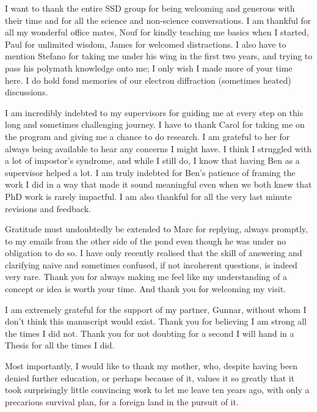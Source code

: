 \documentclass[
11pt, %
oneside, %
english, %
onehalfspacing, %
nolistspacing, %
liststotoc, %
headsepline, %
chapterinoneline, %
]{MastersDoctoralThesis} %
\begin{document}

\begin{acknowledgements}

\vspace{2cm}
I want to thank the entire SSD group for being welcoming and generous with their time and for all the science and non-science conversations. I am thankful for all my wonderful office mates, Nouf for kindly teaching me basics when I started, Paul for unlimited wisdom, James for welcomed distractions. I also have to mention Stefano for taking me under his wing in the first two years, and trying to pass his polymath knowledge onto me; I only wish I made more of your time here. I do hold fond memories of our electron diffraction (sometimes heated) discussions.

I am incredibly indebted to my supervisors for guiding me at every step on this long and sometimes challenging journey. I have to thank Carol for taking me on the program and giving me a chance to do research. I am grateful to her for always being available to hear any concerns I might have. I think I struggled with a lot of impostor's syndrome, and while I still do, I know that having Ben as a supervisor helped a lot. I am truly indebted for Ben's patience of framing the work I did in a way that made it sound meaningful even when we both knew that PhD work is rarely impactful. I am also thankful for all the very last minute revisions and feedback. 

Gratitude must undoubtedly be extended to Marc for replying, always promptly, to my emails from the other side of the pond even though he was under no obligation to do so. I have only recently realised that the skill of answering and clarifying naive and sometimes confused, if not incoherent questions, is indeed very rare. Thank you for always making me feel like my understanding of a concept or idea is worth your time. And thank you for welcoming my visit.

I am extremely grateful for the support of my partner, Gunnar, without whom I don't think this manuscript would exist. Thank you for believing I am strong all the times I did not. Thank you for not doubting for a second I will hand in a Thesis for all the times I did.  


Most importantly, I would like to thank my mother, who, despite having been denied further education, or perhaps because of it, values it so greatly that it took surprisingly little convincing work to let me leave ten years ago, with only a precarious survival plan, for a foreign land in the pursuit of it.   


\end{acknowledgements}
\end{document}
